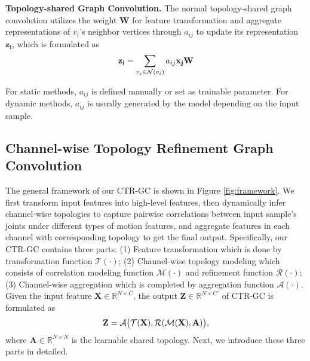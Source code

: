 \documentclass[10pt,twocolumn,letterpaper]{article}
\begin{document}
\noindent \textbf{Topology-shared Graph Convolution.} The normal topology-shared graph convolution utilizes the weight $\mathbf{W}$ for feature transformation and aggregate representations of $v_i$'s neighbor vertices through $a_{ij}$ to update its representation $\mathbf{z_i}$, which is formulated as
\vspace{-0.2cm}
\begin{equation}
\vspace{-0.2cm}
\mathbf{z_i}=\sum_{v_j \in \mathcal{N}(v_i)}a_{ij}\mathbf{x_j}\mathbf{W} \label{eq:fa}
\end{equation}

For static methods, $a_{ij}$ is defined manually or set as trainable parameter. For dynamic methods, $a_{ij}$ is usually generated by the model depending on the input sample. 

\subsection{Channel-wise Topology Refinement Graph Convolution}



The general framework of our CTR-GC is shown in Figure \ref{fig:framework}. We first transform input features into high-level features, then dynamically infer channel-wise topologies to capture pairwise correlations between input sample's joints under different types of motion features, and aggregate features in each channel with corresponding topology to get the final output. Specifically, our CTR-GC contains three parts: (1) Feature transformation which is done by transformation function $\mathcal{T}(\cdot)$; (2) Channel-wise topology modeling which consists of correlation modeling function $\mathcal{M}(\cdot)$ and refinement function $\mathcal{R}(\cdot)$; (3) Channel-wise aggregation which is completed by aggregation function $\mathcal{A}(\cdot)$. Given the input feature $\mathbf{X} \in \mathbb{R}^{N \times C}$, the output $\mathbf{Z} \in \mathbb{R}^{N \times C'}$ of CTR-GC is formulated as
\vspace{-0.2cm}
\begin{equation}
\vspace{-0.1cm}
\mathbf{Z}=\mathcal{A}\big( \mathcal{T}(\mathbf{X}), \mathcal{R}(\mathcal{M}(\mathbf{X}), \mathbf{A})\big),
\end{equation}
where $\mathbf{A} \in \mathbb{R}^{N \times N}$ is the learnable shared topology. Next, we introduce these three parts in detailed.
\end{document}
